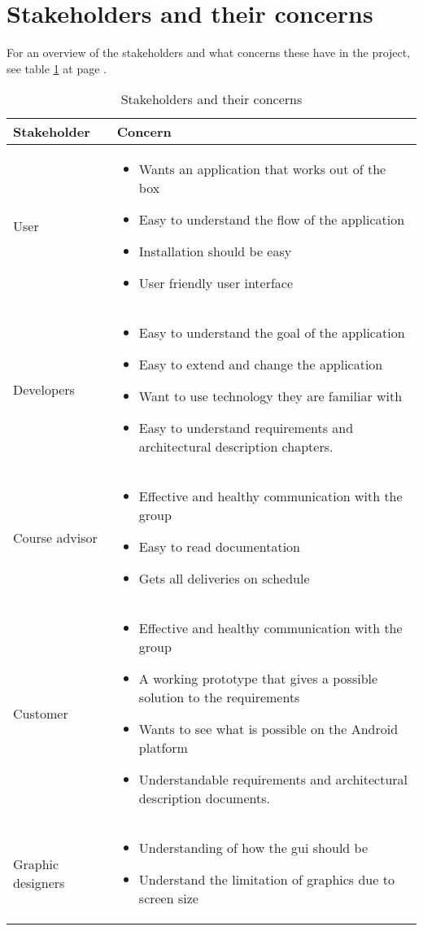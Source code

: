 \section{Stakeholders and their concerns}
For an overview of the stakeholders and what concerns these have in the project, see table \ref{tab:stakeholders} at page \pageref{tab:stakeholders}.

\begin{table}
\begin{tabular}{p{3.5cm}|p{11.5cm}} \hline
\textbf{Stakeholder} & \textbf{Concern} \\ \hline \hline
User & 
\begin{itemize}
\item{} Wants an application that works out of the box
\item{} Easy to understand the flow of the application
\item{} Installation should be easy
\item{} User friendly user interface
\end{itemize}\\ \hline
Developers & 
\begin{itemize}
\item{}Easy to understand the goal of the application
\item{}Easy to extend and change the application
\item{}Want to use technology they are familiar with
\item{}Easy to understand requirements and architectural description chapters.
\end{itemize}\\ \hline
Course advisor & 
\begin{itemize}
\item{}Effective and healthy communication with the group
\item{}Easy to read documentation
\item{}Gets all deliveries on schedule
\end{itemize}\\ \hline
Customer & 
\begin{itemize}
\item{}Effective and healthy communication with the group
\item{}A working prototype that gives a possible solution to the requirements
\item{}Wants to see what is possible on the Android platform
\item{}Understandable requirements and architectural description documents.
\end{itemize}\\ \hline
Graphic designers & 
\begin{itemize}
\item{}Understanding of how the \gls{gui} should be
\item{}Understand the limitation of graphics due to screen size
\end{itemize} \\ \hline
\end{tabular}
\caption{Stakeholders and their concerns} \label{tab:stakeholders}
\end{table}